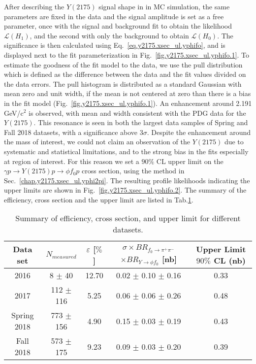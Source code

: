 After describing the $Y(2175)$ signal shape in in MC simulation, the same parameters are fixed in the data and the signal amplitude is set as a free parameter, once with the signal and background fit to obtain the likelihood $\mathcal{L}(H_{1})$, and the second with only the background to obtain $\mathcal{L}(H_{0})$. The significance is then calculated using Eq.~\ref{eq.y2175.xsec_ul.yphifo}, and is displayed next to the fit parameterization in Fig.~\ref{fig.y2175.xsec_ul.yphifo.1}. To estimate the goodness of the fit model to the data, we use the pull distribution which is defined as the difference between the data and the fit values divided on the data errors. The pull histogram is distributed as a standard Gaussian with mean zero and unit width, if the mean is not centered at zero than there is a bias in the fit model (Fig.~\ref{fig.y2175.xsec_ul.yphifo.1}). An enhancement around 2.191 GeV/c$^2$ is observed, with mean and width consistent with the PDG data for the $Y(2175)$. This resonance is seen in both the largest data samples of Spring and Fall 2018 datasets, with a significance above 3$\sigma$. Despite the enhancement around the mass of interest, we could not claim an observation of the $Y(2175)$ due to systematic and statistical limitations, and to the strong bias in the fits especially at region of interest. For this reason we set a $90\%$ CL upper limit on the $\gamma p \rightarrow Y(2175) p \rightarrow \phi f_0 p$ cross section, using the method in Sec.~\ref{chap.y2175.xsec_ul.yphi2pi}. The resulting profile likelihoods indicating the upper limits are shown in Fig.~\ref{fig.y2175.xsec_ul.yphifo.2}. The summary of the efficiency, cross section and the upper limit are listed in Tab.\ref{tab.y2175.xsec_ul.yphifo}.

\begin{center}
    \null
    \vfill
    \begin{table}[htbp]
        \centering
        \caption{Summary of efficiency, cross section, and upper limit for different datasets.}
        \label{tab.y2175.xsec_ul.yphifo}
        \begin{tabular}{|c|c|c|c|c|}
            \hline
            Data set & $N_{measured}$ & $\varepsilon$ [$\%$] & $\sigma \times BR_{f_{0}\rightarrow\pi^{+}\pi^{-}}$ $\times BR_{Y\rightarrow \phi f_0}$ [nb] & \thead{Upper Limit\\$90\%$ CL (nb)}\\
            \hline
            2016 & 8 $\pm$ 40 & 12.70 & 0.02 $\pm$ 0.10 $\pm$ 0.16 & 0.33 \\
            2017 & 112 $\pm$ 116 & 5.25 & 0.06 $\pm$ 0.06 $\pm$ 0.26 & 0.48 \\
            Spring 2018 & 773 $\pm$ 156 & 4.90 & 0.15 $\pm$ 0.03 $\pm$ 0.19 & 0.43 \\
            Fall 2018 & 573 $\pm$ 175 & 9.23 & 0.09 $\pm$ 0.03 $\pm$ 0.20 & 0.39 \\
            \hline
        \end{tabular}
    \end{table}
    \null
    \vfill
\end{center}

